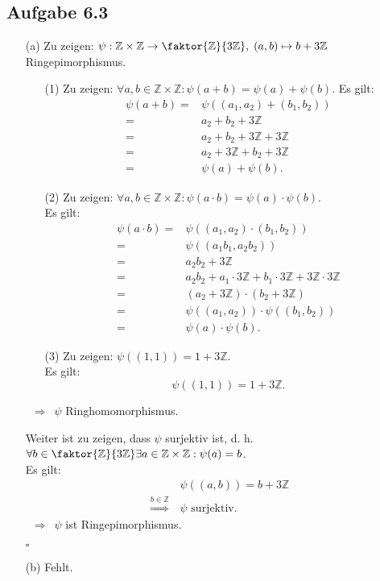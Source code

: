 \documentclass[12pt]{article}
\newcommand{\QED}{\begin{flushright} $\square$ \end{flushright}}
\newcommand{\df}{\enspace\Longrightarrow\enspace}
\begin{document}
\subsection*{Aufgabe 6.3}
\begin{enumerate}
	\item[(a)] Zu zeigen: $\psi:\mathbb{Z}\times\mathbb{Z}\rightarrow\faktor{\mathbb{Z}}{3\mathbb{Z}},\;(a,b)\mapsto b+3\mathbb{Z}$ Ringepimorphismus. \\
	\begin{enumerate}
		\item[(1)] Zu zeigen: $\forall a,b\in \mathbb{Z}\times\mathbb{Z}: \psi(a+b)=\psi(a)+\psi(b)$.
		Es gilt:
		\begin{align*}
			\psi(a+b) = &\psi((a_1,a_2)+(b_1,b_2)) \\
			= &a_2+b_2+3\mathbb{Z} \\
			= &a_2+b_2+3\mathbb{Z}+3\mathbb{Z} \\
			= &a_2+3\mathbb{Z}+b_2+3\mathbb{Z} \\
			= &\psi(a)+\psi(b).
		\end{align*}
		
		\item[(2)] Zu zeigen: $\forall a,b\in \mathbb{Z}\times\mathbb{Z}: \psi(a\cdot b)=\psi(a)\cdot\psi(b)$. \\
		Es gilt:
		\begin{align*}
			\psi(a\cdot b) = &\psi((a_1,a_2)\cdot(b_1,b_2)) \\
			= &\psi((a_1b_1,a_2b_2)) \\
			= &a_2b_2+3\mathbb{Z} \\
			= &a_2b_2+a_1\cdot 3\mathbb{Z}+b_1\cdot 3\mathbb{Z} + 3\mathbb{Z}\cdot 3\mathbb{Z} \\
			= &(a_2 + 3\mathbb{Z})\cdot(b_2+3\mathbb{Z}) \\
			= &\psi((a_1,a_2))\cdot\psi((b_1,b_2)) \\
			= &\psi(a)\cdot\psi(b).
		\end{align*}
		
		\item[(3)] Zu zeigen: $\psi((1,1))=1+3\mathbb{Z}$. \\
		Es gilt:
		$$\psi((1,1)) = 1+3\mathbb{Z}.$$	
	\end{enumerate}
	$\df \psi$ Ringhomomorphismus.
	
	Weiter ist zu zeigen, dass $\psi$ surjektiv ist, d. h. $\forall b\in \faktor{\mathbb{Z}}{3\mathbb{Z}} \exists a\in\mathbb{Z}\times\mathbb{Z}:\psi(a)=b$. \\
	Es gilt:
	\begin{align*}
		&\psi((a,b)) = b+3\mathbb{Z} \\
		\overset{b\in\mathbb{Z}}{\df} &\psi\text{ surjektiv}.
	\end{align*}
	$\df \psi$ ist Ringepimorphismus.
	\QED
	
	\item[(b)] Fehlt.
	\end{enumerate}
\end{document}

